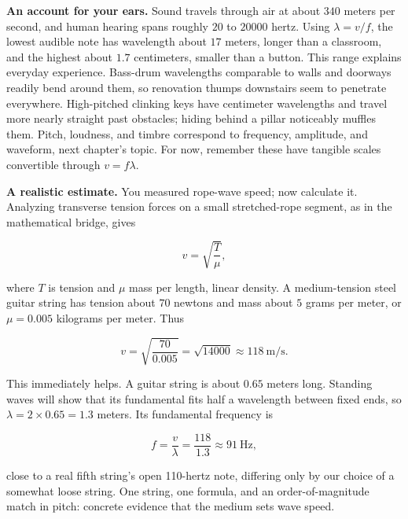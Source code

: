 \begin{mainline}
\textbf{An account for your ears.} Sound travels through air at about \(340\) meters per second, and human hearing spans roughly \(20\) to \(20000\) hertz. Using \(\lambda = v/f\), the lowest audible note has wavelength about \(17\) meters, longer than a classroom, and the highest about \(1.7\) centimeters, smaller than a button. This range explains everyday experience. Bass-drum wavelengths comparable to walls and doorways readily bend around them, so renovation thumps downstairs seem to penetrate everywhere. High-pitched clinking keys have centimeter wavelengths and travel more nearly straight past obstacles; hiding behind a pillar noticeably muffles them. Pitch, loudness, and timbre correspond to frequency, amplitude, and waveform, next chapter's topic. For now, remember these have tangible scales convertible through \(v=f\lambda\).
\end{mainline}

\begin{mainline}
\textbf{A realistic estimate.} You measured rope-wave speed; now calculate it. Analyzing transverse tension forces on a small stretched-rope segment, as in the mathematical bridge, gives

\[
  v = \sqrt{\frac{T}{\mu}},
\]

where \(T\) is tension and \(\mu\) mass per length, linear density. A medium-tension steel guitar string has tension about \(70\) newtons and mass about \(5\) grams per meter, or \(\mu = 0.005\) kilograms per meter. Thus

\[
  v = \sqrt{\frac{70}{0.005}} = \sqrt{14000} \approx 118\ \text{m/s}.
\]

This immediately helps. A guitar string is about \(0.65\) meters long. Standing waves will show that its fundamental fits half a wavelength between fixed ends, so \(\lambda = 2\times 0.65 = 1.3\) meters. Its fundamental frequency is

\[
  f = \frac{v}{\lambda} = \frac{118}{1.3} \approx 91\ \text{Hz},
\]

close to a real fifth string's open 110-hertz note, differing only by our choice of a somewhat loose string. One string, one formula, and an order-of-magnitude match in pitch: concrete evidence that the medium sets wave speed.
\end{mainline}

